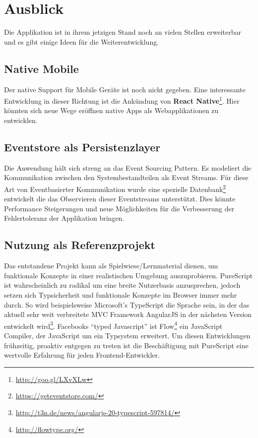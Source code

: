 \section{Ausblick}
Die Applikation ist in ihrem jetzigen Stand noch an vielen Stellen
erweiterbar und es gibt einige Ideen für die Weiterentwicklung.

\subsection{Native Mobile}
Der native Support für Mobile Geräte ist noch nicht gegeben. Eine
interessante Entwicklung in dieser Richtung ist die Ankündung von
\textbf{React Native}\footnote{\url{http://goo.gl/LXvXLw}}.
Hier könnten sich neue Wege eröffnen native Apps als Webapplikationen
zu entwicklen.

\subsection{Eventstore als Persistenzlayer}
Die Anwendung hält sich streng an das \gls{Event Sourcing} Pattern. Es
modeliert die Kommunikation zwischen den Systembestandteilen als Event
Streams. Für diese Art von Eventbasierter Kommunikation wurde eine spezielle
Datenbank\footnote{\url{https://geteventstore.com/}} entwickelt die
das Observieren dieser Eventstreams unterstützt. Dies könnte
Performance Steigerungen und neue Möglichkeiten für die Verbesserung
der Fehlertoleranz der Applikation bringen.

\subsection{Nutzung als Referenzprojekt}
Das entstandene Projekt kann als Spielwiese/Lernmaterial dienen, um
funktionale Konzepte in einer realistischen Umgebung auszuprobieren.
PureScript ist wahrscheinlich zu radikal um eine breite Nutzerbasis
anzusprechen, jedoch setzen sich Typsicherheit und funktionale
Konzepte im Browser immer mehr durch. So wird beispielsweise Microsoft's
TypeScript die Sprache sein, in der das aktuell sehr weit verbreitete MVC
Framework AngularJS in der nächsten Version entwickelt wird\footnote{\url{http://t3n.de/news/angularjs-20-typescript-597814/}}.
Facebooks ``typed Javascript'' ist
Flow\footnote{\url{http://flowtype.org/}} ein JavaScript Compiler, der
JavaScript um ein Typsystem erweitert. Um diesen Entwicklungen
frühzeitig, proaktiv entgegen zu treten ist die Beschäftigung mit
PureScript eine wertvolle Erfahrung für jeden Frontend-Entwickler.

